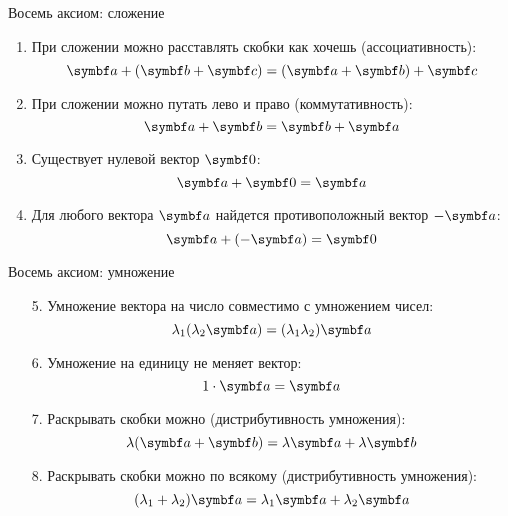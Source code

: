 \begin{frame}{Восемь аксиом: сложение}
\begin{enumerate}
    \item При сложении можно расставлять скобки как хочешь (\alert{ассоциативность}):
    \[
    \ba + (\bb + \bc) = (\ba + \bb) + \bc    
    \]
    \item При сложении можно путать лево и право (\alert{коммутативность}):
    \[
    \ba + \bb = \bb + \ba    
    \]
    \item  Существует \alert{нулевой} вектор $\bzero$:
    \[
    \ba + \bzero = \ba    
    \]
    \item Для любого вектора $\ba$ найдется \alert{противоположный} вектор $-\ba$:
    \[
    \ba + (-\ba) = \bzero    
    \]
\end{enumerate}

\end{frame}


\begin{frame}{Восемь аксиом: умножение}
\begin{enumerate}[resume]
    \item[5.] Умножение вектора на число \alert{совместимо} с умножением чисел:
    \[
    \lambda_1 (\lambda_2\ba) = (\lambda_1 \lambda_2 ) \ba
    \]
    \item[6.]  Умножение на \alert{единицу} не меняет вектор:
    \[
    1\cdot \ba= \ba
    \]
    \item[7.] Раскрывать скобки можно (\alert{дистрибутивность умножения}):
    \[
    \lambda (\ba + \bb) = \lambda \ba + \lambda \bb
    \]
    \item[8.] Раскрывать скобки можно по всякому (\alert{дистрибутивность умножения}):
    \[
    (\lambda_1 + \lambda_2) \ba = \lambda_1 \ba + \lambda_2 \ba
    \]
\end{enumerate}

\end{frame}